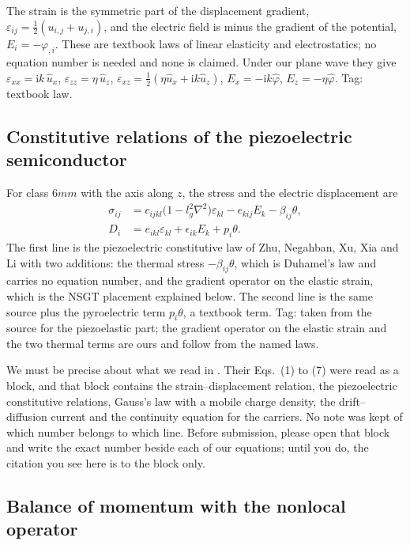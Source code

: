 \documentclass[11pt,a4paper]{article}
\newcommand{\eps}{\varepsilon}
\newcommand{\ii}{\mathrm{i}}
\newcommand{\bx}{\hat u_x}
\newcommand{\bz}{\hat u_z}
\newcommand{\bp}{\hat\varphi}
\begin{document}
The strain is the symmetric part of the displacement gradient, $\eps_{ij}=\tfrac12(u_{i,j}+u_{j,i})$, and
the electric field is minus the gradient of the potential, $E_i=-\varphi_{,i}$. These are textbook laws of
linear elasticity and electrostatics; no equation number is needed and none is claimed. Under our plane
wave they give $\eps_{xx}=\ii k\,\bx$, $\eps_{zz}=\eta\,\bz$,
$\eps_{xz}=\tfrac12(\eta\bx+\ii k\bz)$, $E_x=-\ii k\bp$, $E_z=-\eta\bp$. 
Tag: textbook law.

\subsection{Constitutive relations of the piezoelectric semiconductor}

For class $6mm$ with the axis along $z$, the stress and the electric displacement are
\begin{equation}\label{eq:const}
\begin{aligned}
\sigma_{ij}&=c_{ijkl}\bigl(1-l_g^2\nabla^2\bigr)\eps_{kl}-e_{kij}E_k-\beta_{ij}\theta,\\
D_i&=e_{ikl}\eps_{kl}+\epsilon_{ik}E_k+p_i\theta .
\end{aligned}
\end{equation}
The first line is the piezoelectric constitutive law of Zhu, Negahban, Xu, Xia and Li
\cite[Eqs.~(1)--(3)]{Zhu2023} with two additions: the thermal stress $-\beta_{ij}\theta$, which
is Duhamel's law and carries no equation number, and the gradient operator on the elastic strain, which is
the NSGT placement explained below. The second line is the same source \cite[Eqs.~(1)--(3)]{Zhu2023} plus the pyroelectric term
$p_i\theta$, a textbook term.
Tag: taken from the source for the piezoelastic part; the gradient operator on the elastic strain and the
two thermal terms are ours and follow from the named laws.

We must be precise about what we read in \cite{Zhu2023}. Their Eqs.~(1) to (7) were read as a block, and
that block contains the strain--displacement relation, the piezoelectric constitutive relations, Gauss's law
with a mobile charge density, the drift--diffusion current and the continuity equation for the carriers. No
note was kept of which number belongs to which line. Before submission, please open that block and write
the exact number beside each of our equations; until you do, the citation you see here is to the block only.

\subsection{Balance of momentum with the nonlocal operator}
\end{document}
